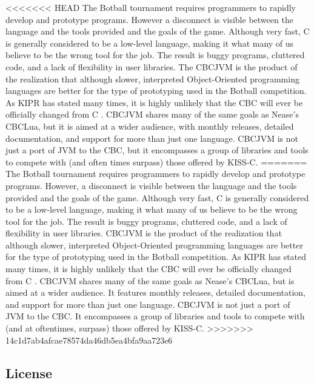 \documentclass[12pt,letterpaper]{article}
\begin{document}
<<<<<<< HEAD
The Botball tournament requires programmers to rapidly develop and prototype programs. However a disconnect is visible between the language and the tools provided and the goals of the game. Although very fast, C is generally considered to be a low-level language, making it what many of us believe to be the wrong tool for the job. The result is buggy programs, cluttered code, and a lack of flexibility in user libraries. The CBCJVM is the product of the realization that although slower, interpreted Object-Oriented programming languages are better for the type of prototyping used in the Botball competition. As KIPR has stated many times, it is highly unlikely that the CBC will ever be officially changed from C \cite{canThereBeCpp}. CBCJVM shares many of the same goals as Nease's CBCLua, but it is aimed at a wider audience, with monthly releases, detailed documentation, and support for more than just one language. CBCJVM is not just a port of JVM to the CBC, but it encompasses a group of libraries and tools to compete with (and often times surpass) those offered by KISS-C.
=======
The Botball tournament requires programmers to rapidly develop and prototype programs. However, a disconnect is visible between the language and the tools provided and the goals of the game. Although very fast, C is generally considered to be a low-level language, making it what many of us believe to be the wrong tool for the job. The result is buggy programs, cluttered code, and a lack of flexibility in user libraries. CBCJVM is the product of the realization that although slower, interpreted Object-Oriented programming languages are better for the type of prototyping used in the Botball competition. As KIPR has stated many times, it is highly unlikely that the CBC will ever be officially changed from C . CBCJVM shares many of the same goals as Nease's CBCLua, but is aimed at a wider audience. It features monthly releases, detailed documentation, and support for more than just one language. CBCJVM is not just a port of JVM to the CBC. It encompasses a group of libraries and tools to compete with (and at oftentimes, surpass) those offered by KISS-C.
>>>>>>> 14c1d7ab4afcae78574da46db5ea4bfa9aa723e6



\subsection{License}
\end{document}
